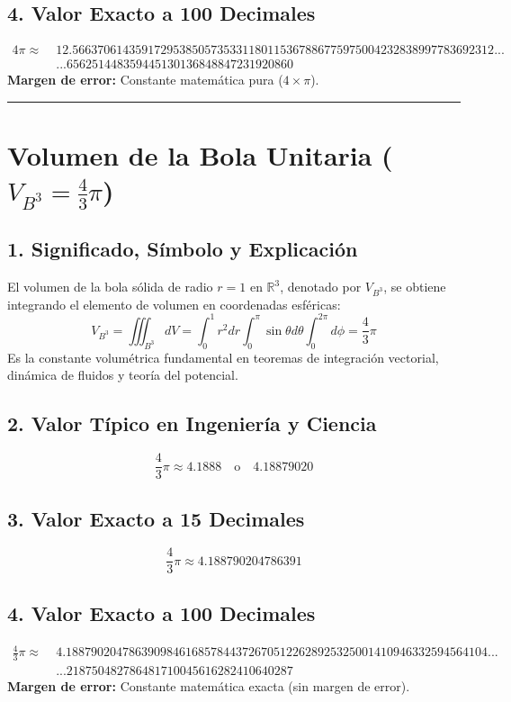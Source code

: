 \documentclass[12pt,a4paper]{article}
\begin{document}
\subsection*{4. Valor Exacto a 100 Decimales}
\begin{align*}
4\pi \approx \; & 12.5663706143591729538505735331180115367886775975004232838997783692312... \\
& ...656251448359445130136848847231920860
\end{align*}
\textbf{Margen de error:} Constante matemática pura ($4 \times \pi$).

\vspace{0.8cm}
\hrule
\vspace{0.8cm}

\section{Volumen de la Bola Unitaria ($V_{B^3} = \frac{4}{3}\pi$)}

\subsection*{1. Significado, Símbolo y Explicación}
El volumen de la bola sólida de radio $r=1$ en $\mathbb{R}^3$, denotado por $V_{B^3}$, se obtiene integrando el elemento de volumen en coordenadas esféricas:
\begin{equation*}
V_{B^3} = \iiint_{B^3} dV = \int_{0}^{1} r^2 dr \int_{0}^{\pi} \sin\theta d\theta \int_{0}^{2\pi} d\phi = \frac{4}{3}\pi
\end{equation*}
Es la constante volumétrica fundamental en teoremas de integración vectorial, dinámica de fluidos y teoría del potencial.

\subsection*{2. Valor Típico en Ingeniería y Ciencia}
\begin{equation*}
\frac{4}{3}\pi \approx 4.1888 \quad \text{o} \quad 4.18879020
\end{equation*}

\subsection*{3. Valor Exacto a 15 Decimales}
\begin{equation*}
\frac{4}{3}\pi \approx 4.188790204786391
\end{equation*}

\subsection*{4. Valor Exacto a 100 Decimales}
\begin{align*}
\frac{4}{3}\pi \approx \; & 4.1887902047863909846168578443726705122628925325001410946332594564104... \\
& ...218750482786481710045616282410640287
\end{align*}
\textbf{Margen de error:} Constante matemática exacta (sin margen de error).
\end{document}
